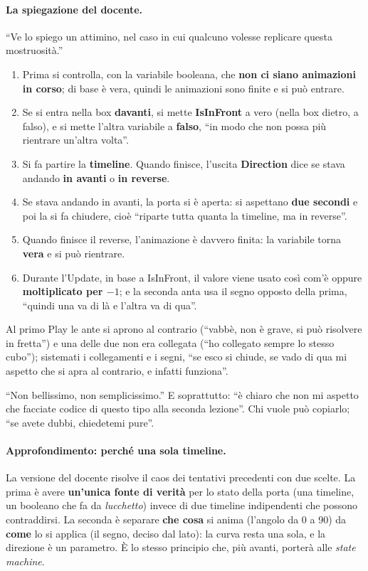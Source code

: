 \paragraph{La spiegazione del docente.} ``Ve lo spiego un attimino, nel caso in
cui qualcuno volesse replicare questa mostruosità.''
\begin{enumerate}
  \item Prima si controlla, con la variabile booleana, che \textbf{non ci siano
        animazioni in corso}; di base è vera, quindi le animazioni sono finite
        e si può entrare.
  \item Se si entra nella box \textbf{davanti}, si mette \textbf{IsInFront} a
        vero (nella box dietro, a falso), e si mette l'altra variabile a
        \textbf{falso}, ``in modo che non possa più rientrare un'altra volta''.
  \item Si fa partire la \textbf{timeline}. Quando finisce, l'uscita
        \textbf{Direction} dice se stava andando \textbf{in avanti} o
        \textbf{in reverse}.
  \item Se stava andando in avanti, la porta si è aperta: si aspettano
        \textbf{due secondi} e poi la si fa chiudere, cioè ``riparte tutta
        quanta la timeline, ma in reverse''.
  \item Quando finisce il reverse, l'animazione è davvero finita: la variabile
        torna \textbf{vera} e si può rientrare.
  \item Durante l'Update, in base a IsInFront, il valore viene usato così com'è
        oppure \textbf{moltiplicato per $-1$}; e la seconda anta usa il segno
        opposto della prima, ``quindi una va di là e l'altra va di qua''.
\end{enumerate}
Al primo Play le ante si aprono al contrario (``vabbè, non è grave, si può
risolvere in fretta'') e una delle due non era collegata (``ho collegato sempre
lo stesso cubo''); sistemati i collegamenti e i segni, ``se esco si chiude, se
vado di qua mi aspetto che si apra al contrario, e infatti funziona''.

``Non bellissimo, non semplicissimo.'' E soprattutto: ``è chiaro che non mi
aspetto che facciate codice di questo tipo alla seconda lezione''. Chi vuole può
copiarlo; ``se avete dubbi, chiedetemi pure''.

\paragraph{Approfondimento: perché una sola timeline.} La versione del docente
risolve il caos dei tentativi precedenti con due scelte. La prima è avere
\textbf{un'unica fonte di verità} per lo stato della porta (una timeline,
un booleano che fa da \emph{lucchetto}) invece di due timeline indipendenti che
possono contraddirsi. La seconda è separare \textbf{che cosa} si anima (l'angolo
da 0 a 90) da \textbf{come} lo si applica (il segno, deciso dal lato): la curva
resta una sola, e la direzione è un parametro. È lo stesso principio che, più
avanti, porterà alle \emph{state machine}.

